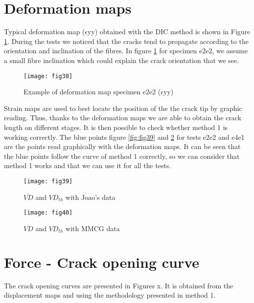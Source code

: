 \section{Deformation maps}

Typical deformation map ($\epsilon$yy) obtained with the DIC method is shown in Figure \ref{fig:fig38}.
During the tests we noticed that the cracks tend to propagate according to the orientation and inclination of the fibres.
In figure \ref{fig:fig38} for specimen e2e2, we assume a small fibre inclination which could explain the crack orientation that we see.

\begin{figure}[htp]
	\centering
	\texttt{[image: fig38]}
	\caption{Example of deformation map specimen e2e2 ($\epsilon$yy)}
	\label{fig:fig38}
\end{figure}

Strain maps are used to best locate the position of the the crack tip by graphic reading.
Thus, thanks to the deformation maps we are able to obtain the crack length on different stages. It is then possible to check whether method 1 is working correctly.
The blue points figure \ref{fig:fig39} and \ref{fig:fig40} for tests e2e2 and e4e1 are the points read graphically with the deformation maps. It can be seen that the blue points follow the curve of method 1 correctly, so we can consider that method 1 works and that we can use it for all the tests.

\begin{figure}[htp]
	\begin{minipage}[c]{.46\linewidth}
		\centering
		\texttt{[image: fig39]}
		\caption{$\overline{VD}$ and $VD_{th}$ with Joao's data}
		\label{fig:fig39}
	\end{minipage}
	\hfill%
	\begin{minipage}[c]{.46\linewidth}
		\centering
		\texttt{[image: fig40]}
		\caption{$\overline{VD}$ and $VD_{th}$ with MMCG data}
		\label{fig:fig40}
	\end{minipage}
\end{figure}


\section{Force - Crack opening curve}

The crack opening curves are presented in Figures x. It is obtained from the displacement maps and using the methodology presented in method 1.

